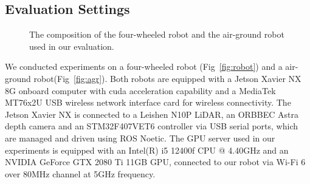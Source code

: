 \subsection{Evaluation Settings}

\begin{figure}[!t]
    \centering
    \vspace{-0.3cm}
    \hfil
    \vspace{-0.3cm}
    \caption{The composition of the four-wheeled robot and the air-ground robot used in our evaluation.}
    \vspace{-0.3cm}
\end{figure}

We conducted experiments on a four-wheeled robot (Fig~\ref{fig:robot}) and a air-ground robot(Fig~\ref{fig:agr}).
Both robots are equipped with a Jetson Xavier NX~\cite{jetsonnx} 8G onboard computer with cuda acceleration capability and a MediaTek MT76x2U USB wireless network interface card for wireless connectivity.
The Jetson Xavier NX is connected to a Leishen N10P LiDAR, an ORBBEC Astra depth camera and an STM32F407VET6 controller via USB serial ports, which are managed and driven using ROS Noetic. 
The GPU server used in our experiments is equipped with an Intel(R) i5 12400f CPU @ 4.40GHz and an NVIDIA GeForce GTX 2080 Ti 11GB GPU, connected to our robot via Wi-Fi 6 over 80MHz channel at 5GHz frequency.


